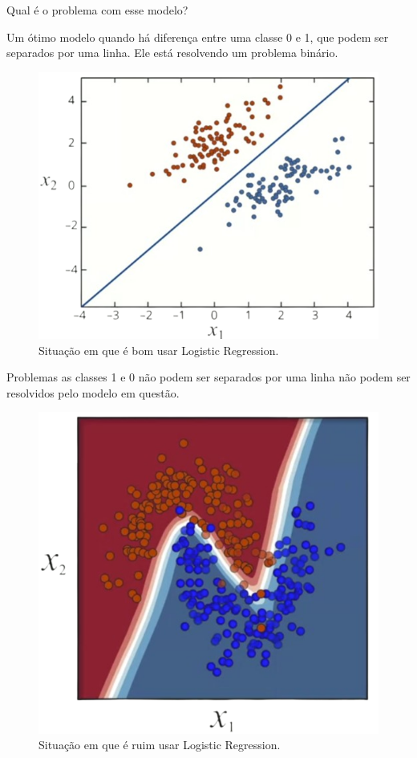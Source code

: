 \documentclass[11pt, a4paper]{article}
\begin{document}
Qual é o problema com esse modelo?

Um ótimo modelo quando há diferença entre uma classe 0 e 1, que podem ser separados por uma linha. Ele está resolvendo um problema binário.

\begin{figure}[h]
\centering
\includegraphics[scale=0.3]{bom-para-logistic-regression}
\caption{Situação em que é bom usar Logistic Regression.}
\end{figure}

Problemas as classes 1 e 0 não podem ser separados por uma linha não podem ser resolvidos pelo modelo em questão.

\begin{figure}[h]
\centering
\includegraphics[scale=0.3]{ruim-para-logistic-regression}
\caption{Situação em que é ruim usar Logistic Regression.}
\end{figure}
\end{document}
